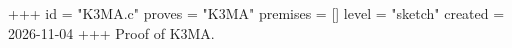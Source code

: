 +++
id = "K3MA.c"
proves = "K3MA"
premises = []
level = "sketch"
created = 2026-11-04
+++
Proof of K3MA.
